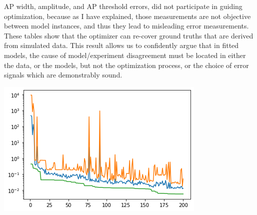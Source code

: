 \begin{table}[ht]
\centering
{}
\end{table}

AP width, amplitude, and AP threshold errors, did not participate in guiding optimization, because as I have explained, those measurements are not objective between model instances, and thus they lead to misleading error measurements. These tables show that the optimizer can re-cover ground truths that are derived from simulated data. This result allows us to confidently argue that in fitted models, the cause of model/experiment disagreement must be located in either the data, or the models, but not the optimization process, or the choice of error signals which are demonstrably sound.


\includegraphics[]{figures/simulated_convergence_performance.png}

